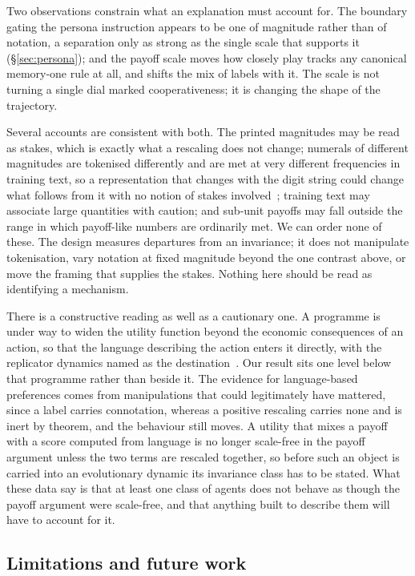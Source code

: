 \documentclass[11pt,a4paper]{article}
\begin{document}
Two observations constrain what an explanation must account for. The boundary
gating the persona instruction appears to be one of magnitude rather than of
notation, a separation only as strong as the single scale that supports it
(\S\ref{sec:persona}); and the payoff scale moves how closely play tracks any
canonical memory-one rule at all, and shifts the mix of labels with it. The
scale is not turning a single dial marked cooperativeness; it is changing the
shape of the trajectory.

Several accounts are consistent with both. The printed magnitudes may be read
as stakes, which is exactly what a rescaling does not change; numerals of
different magnitudes are tokenised differently and are met at very different
frequencies in training text, so a representation that changes with the digit
string could change what follows from it with no notion of stakes
involved~\cite{razeghi2022impact}; training text may associate large quantities
with caution; and sub-unit payoffs may fall outside the range in which
payoff-like numbers are ordinarily met. We can order none of these. The design
measures departures from an invariance; it does not manipulate tokenisation,
vary notation at fixed magnitude beyond the one contrast above, or move the
framing that supplies the stakes. Nothing here should be read as identifying a
mechanism.

There is a constructive reading as well as a cautionary one. A programme is
under way to widen the utility function beyond the economic consequences of an
action, so that the language describing the action enters it directly, with the
replicator dynamics named as the destination~\cite{capraro2024language}. Our
result sits one level below that programme rather than beside it. The evidence
for language-based preferences comes from manipulations that could legitimately
have mattered, since a label carries connotation, whereas a positive rescaling
carries none and is inert by theorem, and the behaviour still moves. A utility
that mixes a payoff with a score computed from language is no longer scale-free
in the payoff argument unless the two terms are rescaled together, so before
such an object is carried into an evolutionary dynamic its invariance class has
to be stated. What these data say is that at least one class of agents does not
behave as though the payoff argument were scale-free, and that anything built
to describe them will have to account for it.

\subsection{Limitations and future work}\label{sec:disc_limitations}
\end{document}
